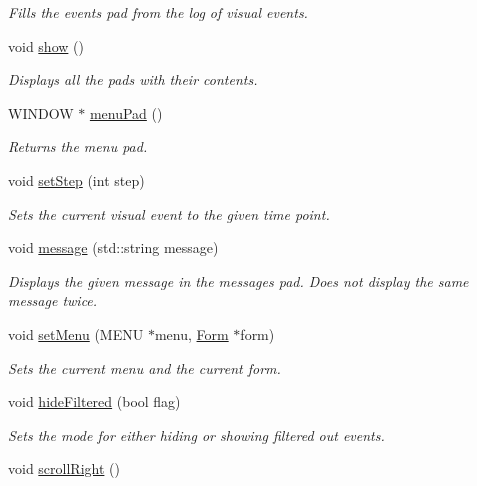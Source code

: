 \begin{DoxyCompactItemize}
\begin{DoxyCompactList}\small\item\em Fills the events pad from the log of visual events. \end{DoxyCompactList}\item 
void \hyperlink{structslb_1_1core_1_1ui_1_1LogWindow_a364583456d4b49477274cfe3bfcaaef3}{show} ()\hypertarget{structslb_1_1core_1_1ui_1_1LogWindow_a364583456d4b49477274cfe3bfcaaef3}{}\label{structslb_1_1core_1_1ui_1_1LogWindow_a364583456d4b49477274cfe3bfcaaef3}

\begin{DoxyCompactList}\small\item\em Displays all the pads with their contents. \end{DoxyCompactList}\item 
W\+I\+N\+D\+OW $\ast$ \hyperlink{structslb_1_1core_1_1ui_1_1LogWindow_a07f5bd77dcdcdbbaad769db2ed62a8af}{menu\+Pad} ()
\begin{DoxyCompactList}\small\item\em Returns the menu pad. \end{DoxyCompactList}\item 
void \hyperlink{structslb_1_1core_1_1ui_1_1LogWindow_aa6d5d2c22360f2562f6078e195d2810e}{set\+Step} (int step)
\begin{DoxyCompactList}\small\item\em Sets the current visual event to the given time point. \end{DoxyCompactList}\item 
void \hyperlink{structslb_1_1core_1_1ui_1_1LogWindow_a41d8e00f24fef8864ae82bab3f94415d}{message} (std\+::string message)
\begin{DoxyCompactList}\small\item\em Displays the given message in the messages pad. Does not display the same message twice. \end{DoxyCompactList}\item 
void \hyperlink{structslb_1_1core_1_1ui_1_1LogWindow_a83de1cc5bc88a99f005fd4eeb74509ae}{set\+Menu} (M\+E\+NU $\ast$menu, \hyperlink{structslb_1_1core_1_1ui_1_1Form}{Form} $\ast$form)
\begin{DoxyCompactList}\small\item\em Sets the current menu and the current form. \end{DoxyCompactList}\item 
void \hyperlink{structslb_1_1core_1_1ui_1_1LogWindow_adf87d7eeeb17ce6e8c9713c337082135}{hide\+Filtered} (bool flag)
\begin{DoxyCompactList}\small\item\em Sets the mode for either hiding or showing filtered out events. \end{DoxyCompactList}\item 
void \hyperlink{structslb_1_1core_1_1ui_1_1LogWindow_a8b5d4129b2503526592a27da4134634a}{scroll\+Right} ()\hypertarget{structslb_1_1core_1_1ui_1_1LogWindow_a8b5d4129b2503526592a27da4134634a}{}\label{structslb_1_1core_1_1ui_1_1LogWindow_a8b5d4129b2503526592a27da4134634a}


\end{DoxyCompactItemize}
